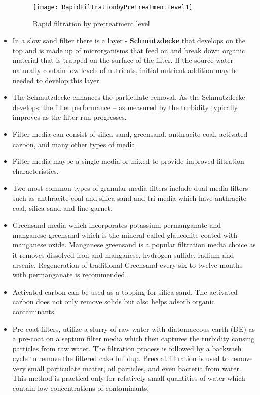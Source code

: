 \begin{itemize}
\begin{figure}[H]
\begin{center}
\texttt{[image: RapidFiltrationbyPretreatmentLevel1]}\\
\end{center}

\caption{Rapid filtration by pretreatment level}  
                \label{figure:RapidFiltrationbyPretreatmentLevel} 
\end{figure}

\item In a slow sand filter there is a  layer - \textbf{Schmutzdecke} that develops on the top and is made up of microrganisms that feed on and break down organic material that is trapped on the surface of the filter. If the source water naturally contain low levels of nutrients, initial nutrient addition may be needed to develop this layer.

\item The Schmutzdecke enhances the particulate removal.  As the Schmutzdecke develops, the filter performance – as measured by the turbidity typically improves as the filter run progresses.

\item Filter media can consist of silica sand, greensand, anthracite coal, activated carbon,
and many other types of media. 
\item Filter media maybe a single media or mixed to provide improved filtration characteristics. 
\item Two most common types of granular media filters include dual-media filters such as anthracite coal and silica sand and tri-media which have anthracite coal, silica sand and fine garnet. 
\item Greensand media which incorporates potassium permanganate and manganese greensand which is the mineral called glauconite coated with manganese oxide.  Manganese greensand is a popular filtration media choice as it removes dissolved iron and manganese, hydrogen sulfide, radium and arsenic. Regeneration of traditional Greensand every six to twelve months with permanganate is recommended.
\item Activated carbon can be used as a topping for silica sand.  The activated carbon  does not only remove solids but also helps adsorb organic contaminants.
\item Pre-coat filters, utilize a slurry of raw water with diatomaceous earth (DE) as a pre-coat on a septum filter media which then captures the turbidity causing particles from raw water.  The filtration process is followed by a backwash cycle to remove the filtered cake buildup.  Precoat filtration is used to remove very small particulate matter, oil particles, and even bacteria from water. This method is practical only for relatively small quantities of water which contain low concentrations of contaminants.


\end{itemize}
